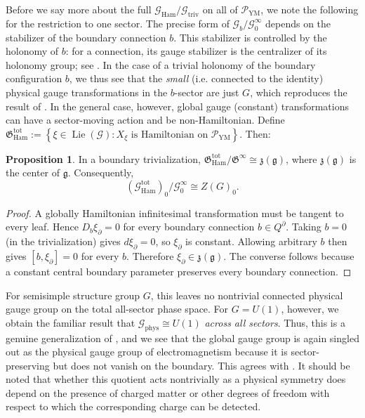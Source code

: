 \documentclass{article}
\theoremstyle{definition}
\newtheorem{proposition}[definition]{Proposition}
\begin{document}
Before we say more about the full $\mathcal{G}_{\mathrm{Ham}}/
     \mathcal G_{\mathrm{triv}}$ on all of $\mathcal{P}_\text{YM}$, we note the following for the restriction to one sector. The precise form of \(\mathcal G_b/\mathcal G^\infty_0\) depends on the
stabilizer of the boundary connection \(b\). This stabilizer is controlled by
the holonomy of \(b\): for a connection, its gauge stabilizer is the centralizer
of its holonomy group; see \cite{Fleischhack:2000am}. In the case of a trivial holonomy of the boundary configuration $b$, we thus see that the \textit{small} (i.e. connected to the identity) physical gauge transformations in the $b$-sector are just $G$, which reproduces the result of \cite{Borsboom:2025agn}. In the general case, however, global gauge (constant) transformations can have a sector-moving action and be non-Hamiltonian. Define $\mathfrak G_{\mathrm{Ham}}^{\mathrm{tot}}
:=
\left\{
\xi\in\operatorname{Lie}(\mathcal G):
X_\xi\text{ is Hamiltonian on }\mathcal{P}_{\mathrm{YM}}
\right\}.$
Then:
\begin{proposition}\label{prop:totalhamiltoniangroup}
In a boundary trivialization, $\mathfrak G_{\mathrm{Ham}}^{\mathrm{tot}}
/
\mathfrak G^\infty
\cong
\mathfrak z(\mathfrak g)$, where \(\mathfrak z(\mathfrak g)\) is the center of \(\mathfrak g\).
Consequently,
\[
(\mathcal G_{\mathrm{Ham}}^{\mathrm{tot}})_0
/
\mathcal G_0^\infty
\cong
Z(G)_0.
\]
\end{proposition}

\begin{proof}
A globally Hamiltonian infinitesimal transformation must be tangent to
every leaf. Hence $D_b\xi_\partial=0$ for every boundary connection \(b\in Q^\partial\). Taking \(b=0\) (in the trivialization) gives
\(d\xi_\partial=0\), so \(\xi_\partial\) is constant. Allowing arbitrary
\(b\) then gives $[b,\xi_\partial]=0$
for every \(b\). Therefore
\(\xi_\partial\in\mathfrak z(\mathfrak g)\). The converse follows
because a constant central boundary parameter preserves every
boundary connection.
\end{proof}
For semisimple structure group \(G\), this leaves no nontrivial connected physical gauge group on the total all-sector phase space. For $G=U(1)$, however, we obtain the familiar result that $\mathcal{G}_\text{phys}\cong U(1)$ \textit{across all sectors}. Thus, this is a genuine generalization of \cite{Borsboom:2025agn}, and we see that the global gauge group is again singled out as the physical gauge group of electromagnetism because it is sector-preserving but does not vanish on the boundary. This agrees with \cite{gomesQuasilocalDegreesFreedom2021,gomesHolismEmpiricalSignificance2021}. It should be noted that whether this quotient acts nontrivially as a
physical symmetry does depend on the presence of charged matter or other degrees
of freedom with respect to which the corresponding charge can be detected.
\end{document}
